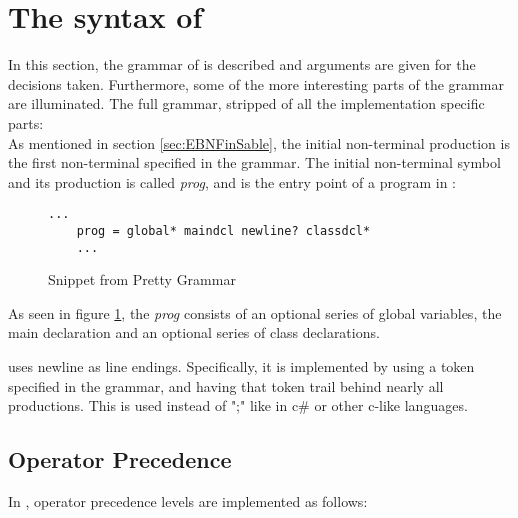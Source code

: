 \section{The syntax of \lang{}}
\label{sec:OurSyntax}
In this section, the grammar of \lang{} is described and arguments are given for the decisions taken. Furthermore, some of the more interesting parts of the grammar are illuminated.
The full grammar, stripped of all the implementation specific parts:\\





As mentioned in section \ref{sec:EBNFinSable}, the initial non-terminal production is the first non-terminal specified in the grammar. The initial non-terminal symbol and its production is called \textit{prog}, and is the entry point of a program in \lang{}:
\begin{figure}[H]
   \centering
    \begin{lstlisting}[]
    ...
    prog = global* maindcl newline? classdcl*
    ...
    \end{lstlisting}
    \caption{Snippet from Pretty Grammar\label{fig:StartProg}}
\end{figure}
As seen in figure \ref{fig:StartProg}, the \textit{prog} consists of an optional series of global variables, the main declaration and an optional series of class declarations.

\lang{} uses newline as line endings. Specifically, it is implemented by using a token specified in the grammar, and having that token trail behind nearly all productions. This is used instead of ";" like in c\# or other c-like languages. 

\subsection{Operator Precedence}
In \lang{}, operator precedence levels are implemented as follows:

